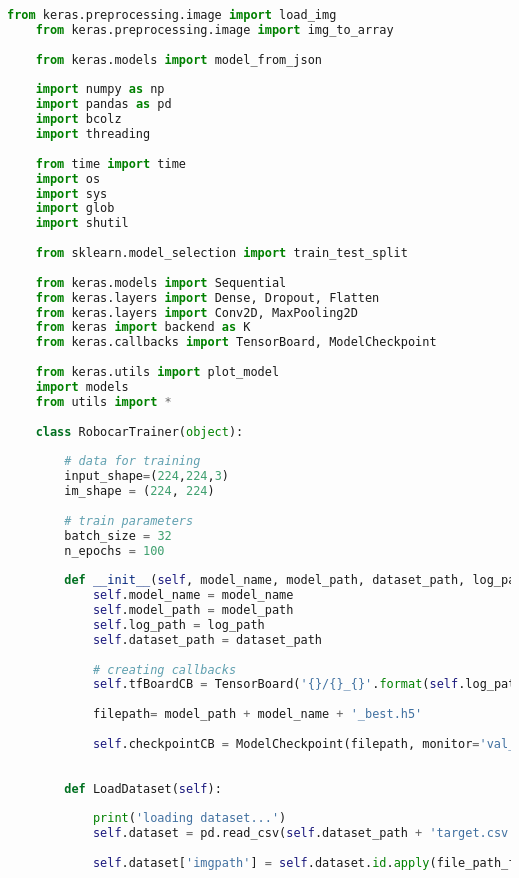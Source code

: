 \begin{lstlisting}[title={msg\_sync.py},language=Python]
    from keras.preprocessing.image import load_img
    from keras.preprocessing.image import img_to_array
    
    from keras.models import model_from_json
        
    import numpy as np
    import pandas as pd
    import bcolz
    import threading
        
    from time import time
    import os
    import sys
    import glob
    import shutil
    
    from sklearn.model_selection import train_test_split
        
    from keras.models import Sequential
    from keras.layers import Dense, Dropout, Flatten
    from keras.layers import Conv2D, MaxPooling2D
    from keras import backend as K
    from keras.callbacks import TensorBoard, ModelCheckpoint
        
    from keras.utils import plot_model
    import models
    from utils import *
        
    class RobocarTrainer(object):
            
        # data for training
        input_shape=(224,224,3)
        im_shape = (224, 224)
        
        # train parameters
        batch_size = 32
        n_epochs = 100
        
        def __init__(self, model_name, model_path, dataset_path, log_path='trainlogs'):
            self.model_name = model_name
            self.model_path = model_path
            self.log_path = log_path
            self.dataset_path = dataset_path
                
            # creating callbacks
            self.tfBoardCB = TensorBoard('{}/{}_{}'.format(self.log_path, model_name, time()), write_graph=True)
        
            filepath= model_path + model_name + '_best.h5'
        
            self.checkpointCB = ModelCheckpoint(filepath, monitor='val_loss', verbose=1, save_best_only=True, mode='min')
        
            
        def LoadDataset(self):
        
            print('loading dataset...')
            self.dataset = pd.read_csv(self.dataset_path + 'target.csv')
        
            self.dataset['imgpath'] = self.dataset.id.apply(file_path_from_db_id, args=("%d.bmp", self.dataset_path))
        

\end{lstlisting}
